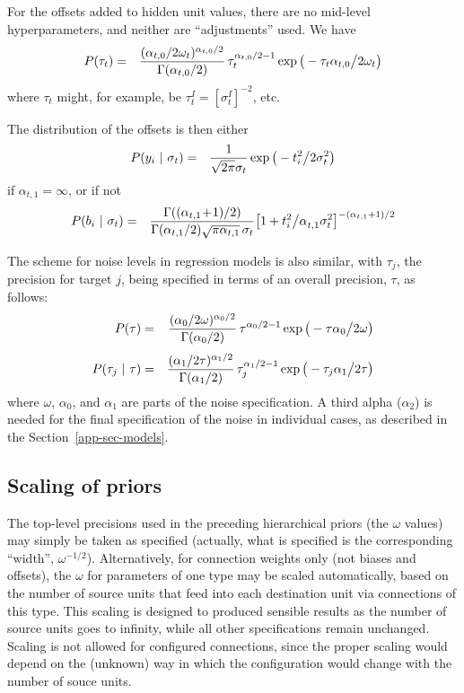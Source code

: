 \documentclass{report}[11pt]
\def\beq{\begin{eqnarray}}
\def\eeq{\end{eqnarray}}
\def\eep{\end{eqnarray}}
\begin{document}
For the offsets added to hidden unit values, there are no mid-level 
hyperparameters, and neither are ``adjustments'' used.  We 
have\vspace{-10pt}\beq
  P(\tau_t)
   & = & {(\alpha_{t,0}/2\omega_t)^{\alpha_{t,0}/2} 
          \over \Gamma(\alpha_{t,0}/2)}\,
         \tau_t^{\alpha_{t,0}/2-1}
         \exp \big(-\tau_t \alpha_{t,0} \big/ 2 \omega_t \big) 
\eeq%
where $\tau_t$ might, for example, be $\tau^{I}_t = [\sigma^{I}_t]^{-2}$, etc.

The distribution of the offsets is then either\beq
  P(y_i\ |\ \sigma_t) & = &
    {1 \over \sqrt{2\pi} \sigma_t} 
    \exp \big( - t_i^2 \big/ 2\sigma_t^2 \big)
\label{priortg}\eeq%
if $\alpha_{t,1}=\infty$, or if not\beq
  P(b_i\ |\ \sigma_t) & = &
    {\Gamma((\alpha_{t,1}\!+\!1)/2) \over 
     \Gamma(\alpha_{t,1}/2) \sqrt{\pi\alpha_{t,1}}\, \sigma_t}
    \big[ 1 + t_i^2 \big/ \alpha_{t,1}^{\ }\sigma_t^2\big]^{-(\alpha_{t,1}+1)/2}
\label{priortt}\eep

The scheme for noise levels in regression models is also similar, with
$\tau_j$, the precision for target $j$, being specified in terms of
an overall precision, $\tau$, as follows:\beq
  P(\tau)
   & = & {(\alpha_{0}/2\omega)^{\alpha_{0}/2} 
          \over \Gamma(\alpha_{0}/2)}\,
         \tau^{\alpha_{0}/2-1}
         \exp \big(-\tau \alpha_{0} \big/ 2 \omega \big) 
\label{noiseprior1}\\[3pt]
  P(\tau_{j}\ |\ \tau)
   & = & {(\alpha_{1}/2\tau)^{\alpha_{1}/2} 
          \over \Gamma(\alpha_{1}/2)}\,
         \tau_{j}^{\alpha_{1}/2-1}
         \exp \big(-\tau_{j} \alpha_{1} \big/ 2 \tau \big)
\label{noiseprior2}\eeq%
where $\omega$, $\alpha_0$, and $\alpha_1$ are parts of the noise
specification.  A third alpha ($\alpha_2$) is needed for the final
specification of the noise in individual cases, as described in the
Section~\ref{app-sec-models}.


\subsection*{Scaling of priors}

The top-level precisions used in the preceding hierarchical priors
(the $\omega$ values) may simply be taken as specified (actually, what
is specified is the corresponding ``width'', $\omega^{-1/2}$).
Alternatively, for connection weights only (not biases and offsets),
the $\omega$ for parameters of one type may be scaled automatically,
based on the number of source units that feed into each destination
unit via connections of this type.  This scaling is designed to
produced sensible results as the number of source units goes to
infinity, while all other specifications remain unchanged.  Scaling is
not allowed for configured connections, since the proper scaling would
depend on the (unknown) way in which the configuration would change
with the number of souce units.
\end{document}
